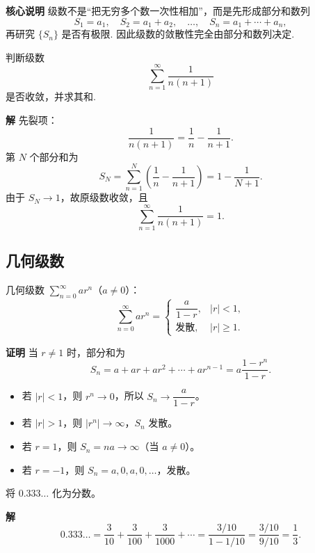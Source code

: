 \documentclass[fontset=fandol]{ctexart}
\newenvironment{custom}[1]{\par\noindent\textbf{#1}\quad}{\par\vspace{0.8em}}
\begin{document}
\begin{custom}{核心说明}
级数不是“把无穷多个数一次性相加”，而是先形成部分和数列
\[
S_1=a_1,\quad S_2=a_1+a_2,\quad \ldots,\quad S_n=a_1+\cdots+a_n,
\]
再研究 $\{S_n\}$ 是否有极限. 因此级数的敛散性完全由部分和数列决定.
\end{custom}

\begin{example}
判断级数
\[
\sum_{n=1}^{\infty}\frac{1}{n(n+1)}
\]
是否收敛，并求其和.
\end{example}
\begin{custom}{解}
先裂项：
\[
\frac{1}{n(n+1)}=\frac1n-\frac{1}{n+1}.
\]
第 $N$ 个部分和为
\[
S_N=\sum_{n=1}^{N}\left(\frac1n-\frac{1}{n+1}\right)
=1-\frac{1}{N+1}.
\]
由于 $S_N\to1$，故原级数收敛，且
\[
\sum_{n=1}^{\infty}\frac{1}{n(n+1)}=1.
\]
\end{custom}

\subsection{几何级数}

\begin{theorem}[几何级数]
几何级数 \(\sum_{n=0}^{\infty} ar^n\)（\(a \neq 0\)）：
\[
\sum_{n=0}^{\infty} ar^n = 
\begin{cases}
\dfrac{a}{1-r}, & |r| < 1,\\[6pt]
\text{发散}, & |r| \geq 1.
\end{cases}
\]
\end{theorem}

\begin{custom}{证明}
当 \(r \neq 1\) 时，部分和为
\[
S_n = a + ar + ar^2 + \cdots + ar^{n-1} = a\dfrac{1-r^n}{1-r}.
\]
\begin{itemize}
\item 若 \(|r| < 1\)，则 \(r^n \to 0\)，所以 \(S_n \to \dfrac{a}{1-r}\)。
\item 若 \(|r| > 1\)，则 \(|r^n| \to \infty\)，\(S_n\) 发散。
\item 若 \(r = 1\)，则 \(S_n = na \to \infty\)（当 \(a \neq 0\)）。
\item 若 \(r = -1\)，则 \(S_n = a, 0, a, 0, \dots\)，发散。
\end{itemize}
\end{custom}

\begin{example}[应用：循环小数化分数]
将 \(0.333\ldots\) 化为分数。
\end{example}
\begin{custom}{解}
\[
0.333\ldots = \dfrac{3}{10} + \dfrac{3}{100} + \dfrac{3}{1000} + \cdots = \dfrac{3/10}{1-1/10} = \dfrac{3/10}{9/10} = \dfrac{1}{3}.
\]
\end{custom}
\end{document}
